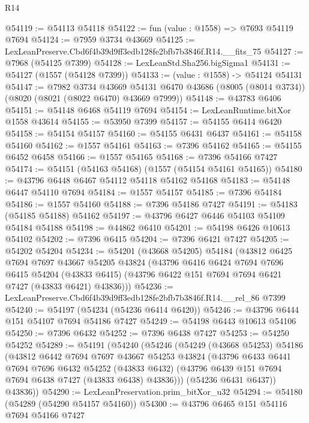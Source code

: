 \begin{lexlean}{R14}
\begin{coremodule}
@54119 := @54113 @54118
@54122 := fun (value : @1558) => @7693 @54119 @7694
@54124 := @7959 @3734 @43669
@54125 := LexLeanPreserve.Cbd6f4b39d9ff3edb128fe2bfb7b3846f.R14.__fits_75
@54127 := @7968 (@54125 @7399)
@54128 := LexLeanStd.Sha256.bigSigma1
@54131 := @54127 (@1557 (@54128 @7399))
@54133 := (value : @1558) -> @54124 @54131
@54147 := @7982
    @3734
    @43669
    @54131
    @6470
    @43686
    (@8005 (@8014 @3734))
    (@8020 (@8021 (@8022 @6470) @43669 @7999))
@54148 := @43783 @6406
@54151 := @54148 @6468 @54119 @7694
@54154 := LexLeanRuntime.bitXor @1558 @43614
@54155 := @53950 @7399
@54157 := @54155 @6414 @6420
@54158 := @54154 @54157
@54160 := @54155 @6431 @6437
@54161 := @54158 @54160
@54162 := @1557 @54161
@54163 := @7396 @54162
@54165 := @54155 @6452 @6458
@54166 := @1557 @54165
@54168 := @7396 @54166 @7427
@54174 := @54151 (@54163 @54168) (@1557 (@54154 @54161 @54165))
@54180 := @43796 @6448 @6467 @54112 @54118 @54162 @54168
@54183 := @54148 @6447 @54110 @7694
@54184 := @1557 @54157
@54185 := @7396 @54184
@54186 := @1557 @54160
@54188 := @7396 @54186 @7427
@54191 := @54183 (@54185 @54188) @54162
@54197 := @43796 @6427 @6446 @54103 @54109 @54184 @54188
@54198 := @44862 @6410
@54201 := @54198 @6426 @10613 @54102
@54202 := @7396 @6415
@54204 := @7396 @6421 @7427
@54205 := @54202 @54204
@54234 := @54201
    (@43668 @54205)
    @54184
    (@43812
      @6425
      @7694
      @7697
      @43667
      @54205
      @43824
      (@43796
        @6416
        @6424
        @7694
        @7696
        @6415
        @54204
        (@43833 @6415)
        (@43796 @6422 @151 @7694 @7694 @6421 @7427 (@43833 @6421) @43836)))
@54236 := LexLeanPreserve.Cbd6f4b39d9ff3edb128fe2bfb7b3846f.R14.__rel_86 @7399
@54240 := @54197 (@54234 (@54236 @6414 @6420))
@54246 := @43796 @6444 @151 @54107 @7694 @54186 @7427
@54249 := @54198 @6443 @10613 @54106
@54250 := @7396 @6432
@54252 := @7396 @6438 @7427
@54253 := @54250 @54252
@54289 := @54191
    (@54240
      (@54246
        (@54249
          (@43668 @54253)
          @54186
          (@43812
            @6442
            @7694
            @7697
            @43667
            @54253
            @43824
            (@43796
              @6433
              @6441
              @7694
              @7696
              @6432
              @54252
              (@43833 @6432)
              (@43796 @6439 @151 @7694 @7694 @6438 @7427 (@43833 @6438) @43836)))
          (@54236 @6431 @6437))
        @43836))
@54290 := LexLeanPreservation.prim_bitXor_u32
@54294 := @54180 (@54289 (@54290 @54157 @54160))
@54300 := @43796 @6465 @151 @54116 @7694 @54166 @7427

\end{coremodule}
\end{lexlean}
